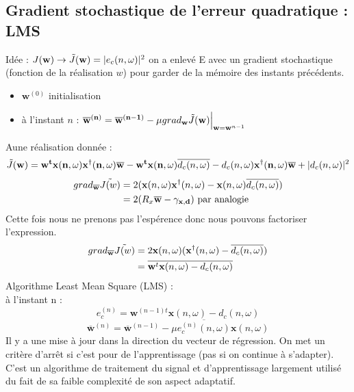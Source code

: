 \documentclass[12pt]{article}
\begin{document}
\subsection{Gradient stochastique de l'erreur quadratique : LMS}
Idée : $ J(\mathbf{w}) \rightarrow \Tilde{J}(\mathbf{w}) = |e_c(n,\omega)|^2$ on a enlevé E avec un gradient stochastique (fonction de la réalisation $w$) pour garder de la mémoire des instants précédents. 
\begin{itemize}
    \item $\mathbf{w}^{(0)}$ initialisation
    \item à l'instant $n$ : $\mathbf{\overline{w}^{(n)}} = \mathbf{\overline{w}^{(n-1)}} - \mu grad_{\mathbf{w}}\Tilde{J}(\mathbf{w)} \Big|_{\mathbf{w} = \mathbf{w}^{n-1}}$ 
\end{itemize}
Aune réalisation donnée : $$\Tilde{J}(\mathbf{w}) = \mathbf{w^t} \mathbf{x(n,\omega)} \mathbf{x^\dag (n,\omega)} \mathbf{\overline{w}}  - \mathbf{w^t} \mathbf{x(n,\omega)} \overline{d_c(n,\omega)} - d_c(n,\omega) \mathbf{x^\dag (n,\omega)} \mathbf{\overline{w}} + |d_c(n,\omega)|^2 $$
\begin{align}
    grad_\mathbf{\overline{w}} \Tilde{J(w)} 
    &= 2(\mathbf{x}(n,\omega)\mathbf{x}^\dag(n,\omega) - \mathbf{x}(n,\omega)\overline{d_c(n,\omega)}) \nonumber \\
    &=2(R_x \mathbf{\overline{w}} - \mathbf{\gamma_{x,d}}) \text{ par analogie} \nonumber 
\end{align}
Cette fois nous ne prenons pas l'espérence donc nous pouvons factoriser l'expression.
\begin{align}
    grad_\mathbf{\overline{w}} \Tilde{J(w)} 
    &= 2 \mathbf{x}(n,\omega)(\mathbf{x}^\dag(n,\omega) - \overline{d_c(n,\omega)}) \nonumber \\
    &= \overline{\mathbf{w}^t\mathbf{x}(n,\omega) - d_c(n,\omega)} \nonumber
\end{align}
Algorithme Least Mean Square (LMS) : \\
à l'instant n : 
$$e_c^{(n)} = \mathbf{w}^{(n-1)t}\mathbf{x}(n,\omega) - d_c(n,\omega)$$
$$\overline{\mathbf{w}}^{(n)} = \overline{\mathbf{w}}^{(n-1)} - \mu \overline{e_c^{(n)}(n,\omega)}\mathbf{x}(n,\omega)$$
Il y a une mise à jour dans la direction du vecteur de régression. On met un critère d'arrêt si c'est pour de l'apprentissage (pas si on continue à s'adapter).\\
C'est un algorithme de traitement du signal et d'apprentissage largement utilisé du fait de sa faible complexité de son aspect adaptatif.\\
\end{document}
